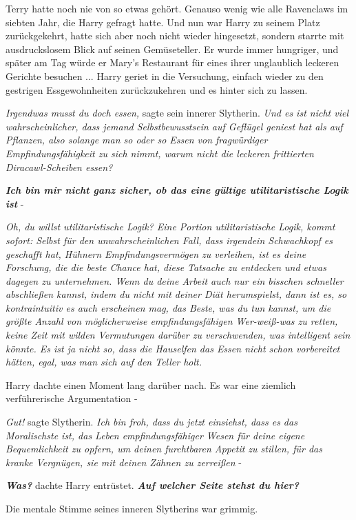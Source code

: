 Terry hatte noch nie von so etwas gehört. Genauso wenig wie alle Ravenclaws im
siebten Jahr, die Harry gefragt hatte. Und nun war Harry zu seinem Platz
zurückgekehrt, hatte sich aber noch nicht wieder hingesetzt, sondern starrte mit
ausdruckslosem Blick auf seinen Gemüseteller. Er wurde immer hungriger, und
später am Tag würde er Mary's Restaurant für eines ihrer unglaublich leckeren
Gerichte besuchen ... Harry geriet in die Versuchung, einfach wieder zu den
gestrigen Essgewohnheiten zurückzukehren und es hinter sich zu lassen.

\emph{Irgendwas musst du doch essen,} sagte sein innerer Slytherin.
\emph{Und es ist nicht viel wahrscheinlicher, dass jemand Selbstbewusstsein auf
Geflügel geniest hat als auf Pflanzen, also solange man so oder so Essen von
fragwürdiger Empfindungsfähigkeit zu sich nimmt, warum nicht die leckeren
frittierten Diracawl-Scheiben essen?}

\textbf{\emph{Ich bin mir nicht ganz sicher, ob das eine gültige
utilitaristische Logik ist}} -

\emph{Oh, du willst utilitaristische Logik? Eine Portion utilitaristische
Logik, kommt sofort: Selbst für den unwahrscheinlichen Fall, dass irgendein
Schwachkopf es geschafft hat, Hühnern Empfindungsvermögen zu verleihen, ist es
deine Forschung, die die beste Chance hat, diese Tatsache zu entdecken und
etwas dagegen zu unternehmen. Wenn du deine Arbeit auch nur ein bisschen
schneller abschließen kannst, indem du nicht mit deiner Diät herumspielst, dann
ist es, so kontraintuitiv es auch erscheinen mag, das Beste, was du tun kannst,
um die größte Anzahl von möglicherweise empfindungsfähigen Wer-weiß-was zu
retten, keine Zeit mit wilden Vermutungen darüber zu verschwenden, was
intelligent sein könnte. Es ist ja nicht so, dass die Hauselfen das Essen nicht
schon vorbereitet hätten, egal, was man sich auf den Teller holt.}

Harry dachte einen Moment lang darüber nach. Es war eine ziemlich verführerische
Argumentation -

\emph{Gut!} sagte Slytherin. \emph{Ich bin froh, dass du jetzt einsiehst, dass
es das Moralischste ist, das Leben empfindungsfähiger Wesen für deine eigene
Bequemlichkeit zu opfern, um deinen furchtbaren Appetit zu stillen, für das
kranke Vergnügen, sie mit deinen Zähnen zu zerreißen} -

\textbf{\emph{Was?}} dachte Harry entrüstet. \textbf{\emph{Auf welcher Seite
stehst du hier?}}

Die mentale Stimme seines inneren Slytherins war grimmig.


